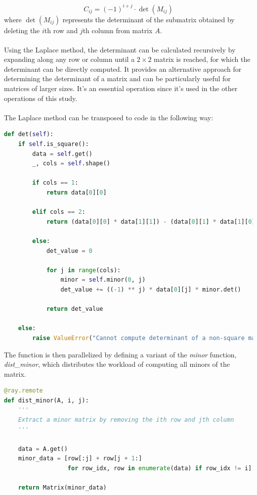 $$
    C_{ij} = (-1)^{i+j} \cdot \det(M_{ij})
$$
where $\det(M_{ij})$ represents the determinant of the submatrix obtained by deleting the $i$th row and $j$th column from matrix $A$.
\\\\
Using the Laplace method, the determinant can be calculated recursively by expanding along any row or column until a $2 \times 2$ matrix is reached, for which the determinant can be directly computed. It provides an alternative approach for determining the determinant of a matrix and can be particularly useful for matrices of larger sizes. It's an essential operation since it's used in the other operations of this study.
\\\\
The Laplace method can be transposed to code in the following way:
\begin{lstlisting}[language=Python, caption={Determinant function}]
def det(self):
    if self.is_square():
        data = self.get()
        _, cols = self.shape()

        if cols == 1:
            return data[0][0]

        elif cols == 2:
            return (data[0][0] * data[1][1]) - (data[0][1] * data[1][0])

        else:
            det_value = 0

            for j in range(cols):
                minor = self.minor(0, j)
                det_value += ((-1) ** j) * data[0][j] * minor.det()

            return det_value

    else:
        raise ValueError("Cannot compute determinant of a non-square matrix")
\end{lstlisting}
The function is then parallelized by defining a variant of the \textit{minor} function, \textit{dist\_minor}, which distributes the workload of computing all minors of the matrix.

\begin{lstlisting}[language=Python, caption={dist\_minor}]
@ray.remote
def dist_minor(A, i, j):
    '''
    Extract a minor matrix by removing the ith row and jth column
    '''

    data = A.get()
    minor_data = [row[:j] + row[j + 1:]
                  for row_idx, row in enumerate(data) if row_idx != i]

    return Matrix(minor_data)
\end{lstlisting}

